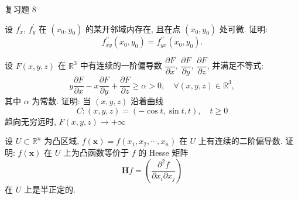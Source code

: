\begin{exblock}{复习题 8}
\item 设 $f_{x}^{\prime}$, $f_{y}^{\prime}$ 在 $(x_{0}, y_{0})$ 的某开邻域内存在, 且在点 $(x_{0}, y_{0})$ 处可微. 证明:
\[
  f_{xy}^{\prime\prime}(x_{0}, y_{0}) = f_{yx}^{\prime\prime}(x_{0}, y_{0}).
\]

\item 设 $F(x,y,z)$ 在 $\mathbb{R}^{3}$ 中有连续的一阶偏导数 $\dfrac{\partial F}{\partial x}$, $\dfrac{\partial F}{\partial y}$, $\dfrac{\partial F}{\partial z}$, 并满足不等式:
\[
  y\frac{\partial F}{\partial x} - x\frac{\partial F}{\partial y} + \frac{\partial F}{\partial z} \geqslant \alpha > 0, \quad \forall (x,y,z) \in \mathbb{R}^{3},
\]
其中 $\alpha$ 为常数. 证明: 当 $(x,y,z)$ 沿着曲线
\[
  C: (x,y,z) = (-\cos t, \sin t, t), \quad t \geqslant 0
\]
趋向无穷远时, $F(x,y,z) \to +\infty$

\item 设 $U \subset \mathbb{R}^{n}$ 为凸区域, $f(\boldsymbol{x}) = f(x_{1}, x_{2}, \cdots, x_{n})$ 在 $U$ 上有连续的二阶偏导数. 证明: $f(\boldsymbol{x})$ 在 $U$ 上为凸函数等价于 $f$ 的 Hesse 矩阵
\[
  \boldsymbol{H}f = \left(\frac{\partial^{2}f}{\partial x_{i}\partial x_{j}}\right)
\]
在 $U$ 上是半正定的.
\end{exblock}
